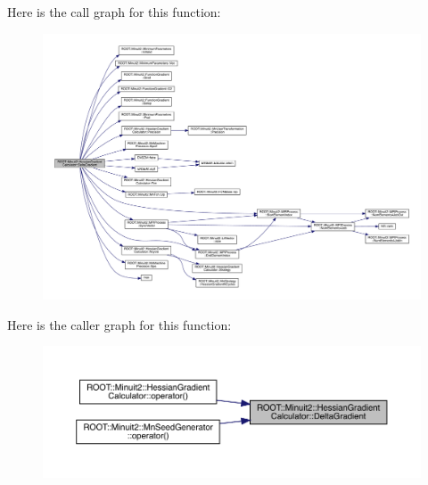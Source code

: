 Here is the call graph for this function\+:
\nopagebreak
\begin{figure}[H]
\begin{center}
\leavevmode
\includegraphics[width=350pt]{dc/d17/classROOT_1_1Minuit2_1_1HessianGradientCalculator_ace21cdfb201391d53a015e373977c2d1_cgraph}
\end{center}
\end{figure}
Here is the caller graph for this function\+:
\nopagebreak
\begin{figure}[H]
\begin{center}
\leavevmode
\includegraphics[width=350pt]{dc/d17/classROOT_1_1Minuit2_1_1HessianGradientCalculator_ace21cdfb201391d53a015e373977c2d1_icgraph}
\end{center}
\end{figure}
\mbox{\label{classROOT_1_1Minuit2_1_1HessianGradientCalculator_a808c1f808c436fbb6b67cb8af13d0480}} 
